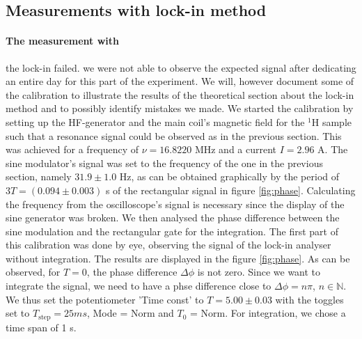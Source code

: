\subsection{Measurements with lock-in method}
\paragraph{The measurement with}
the lock-in failed. we were not able to observe the expected signal 
after dedicating an entire day for this part of the experiment. We will, however document some 
of the calibration to illustrate the results of the theoretical section about the lock-in method 
and to possibly identify mistakes we made. 
We started the calibration by setting up the HF-generator and the main coil's magnetic field 
for the $^1$H sample such that a resonance signal could be observed as in the previous section.
This was achieved for a frequency of $\nu = 16.8220$ MHz and a current $I = 2.96$ A. 
The sine modulator's signal was set to the frequency of the one in the previous section, 
namely $31.9 \pm 1.0$ Hz, as can be obtained graphically by the period of $3T = (0.094 \pm 0.003)$ s 
of the rectangular signal in figure \ref{fig:phase}. Calculating the frequency from the 
oscilloscope's signal is necessary since the display of the sine generator was broken. 
We then analysed the phase difference between the sine modulation and the rectangular gate 
for the integration. The first part of this calibration was done by eye, observing the 
signal of the lock-in analyser without integration. The results are displayed in the figure
\ref{fig:phase}. As can be observed, for $T = 0$, the phase difference $\Delta \phi$ is not zero. 
Since we want to integrate the signal, we need to have a phse difference close to $\Delta \phi = n \pi$, 
$n \in \mathbb{N}$. We thus set the potentiometer 'Time const' to $T = 5.00 \pm 0.03$ with the 
toggles set to $T_\mathrm{step} = 25ms$, Mode = Norm and $T_0$ = Norm. For integration, we 
chose a time span of 1 s. 


